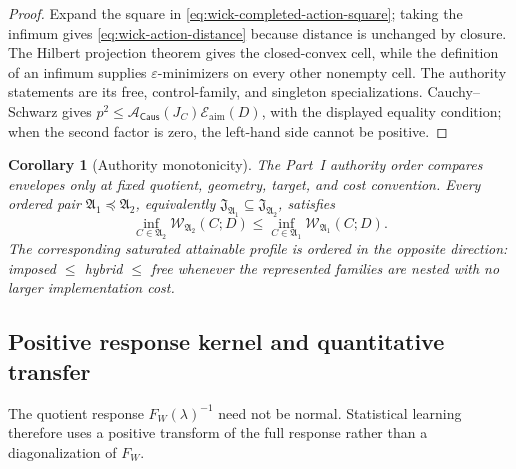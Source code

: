 \documentclass[11pt]{article}
\numberwithin{section}{part}
\theoremstyle{plain}
\newtheorem{corollary}[corollary]{Corollary}
\theoremstyle{definition}
\theoremstyle{remark}
\newcommand{\Caus}{\mathsf{Caus}}
\begin{document}
\begin{proof}
Expand the square in \eqref{eq:wick-completed-action-square}; taking the
infimum gives \eqref{eq:wick-action-distance} because distance is unchanged
by closure.  The Hilbert projection theorem gives the closed-convex cell,
while the definition of an infimum supplies \(\varepsilon\)-minimizers on
every other nonempty cell.  The authority statements are its free,
control-family, and singleton specializations.  Cauchy--Schwarz
gives
\(p^2\le\mathcal A_{\Caus}(J_C)\mathcal E_{\mathrm{aim}}(D)\), with
the displayed equality condition; when the second factor is zero, the
left-hand side cannot be positive.
\end{proof}

\begin{corollary}[Authority monotonicity]
\label{cor:wick-authority-monotonicity}
The Part~I authority order compares envelopes only at fixed quotient,
geometry, target, and cost convention.  Every ordered pair
\(\mathfrak A_1\preceq\mathfrak A_2\), equivalently
\(\mathfrak J_{\mathfrak A_1}\subseteq
\mathfrak J_{\mathfrak A_2}\), satisfies
\[
 \inf_{C\in\mathfrak A_2}\mathscr W_{\mathfrak A_2}(C;D)
 \le
 \inf_{C\in\mathfrak A_1}\mathscr W_{\mathfrak A_1}(C;D).
\]
The corresponding saturated attainable profile is ordered in the opposite
direction:
imposed \(\le\) hybrid \(\le\) free whenever the represented families are
nested with no larger implementation cost.
\end{corollary}

\subsection{Positive response kernel and quantitative transfer}
\label{subsec:wick-learning-kernel}

The quotient response \(F_W(\lambda)^{-1}\) need not be normal.  Statistical
learning therefore uses a positive transform of the full response rather
than a diagonalization of \(F_W\).
\end{document}
